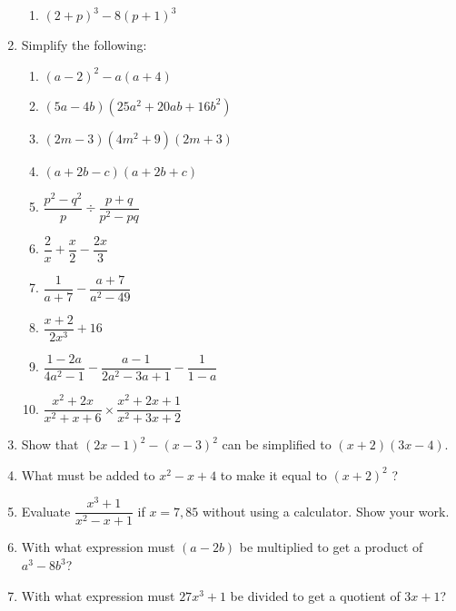 \begin{eocexercises}{}
\begin{enumerate}[itemsep=5pt, label=\textbf{\arabic*}. ]
\begin{multicols}{2}
\begin{enumerate}[itemsep=2pt, label=\textbf{(\alph*)} ]
\item $(2+p)^3- 8(p+1)^3$
\end{enumerate}
\end{multicols}
\item Simplify the following:
\begin{multicols}{2}
\begin{enumerate}[itemsep=4pt, label=\textbf{(\alph*)} ] 
\item ${(a-2)}^{2}-a(a+4)$
\item $(5a-4b)(25{a}^{2}+20ab+16{b}^{2})$
\item $(2m-3)(4{m}^{2}+9)(2m+3)$
\item $(a+2b-c)(a+2b+c)$
\item $\dfrac{{p}^{2}-{q}^{2}}{p}÷\dfrac{p+q}{{p}^{2}-pq}$
\item $\dfrac{2}{x}+\dfrac{x}{2}-\dfrac{2x}{3}$
\item $\dfrac{1}{a+7}-\dfrac{a+7}{a^{2}-49}$
\item $\dfrac{x+2}{2x^{3}} + 16$
\item $\dfrac{1-2a}{4a^{2} -1} - \dfrac{a-1}{2a^{2}-3a+1} - \dfrac{1}{1-a}$
\item $\dfrac{x^{2} + 2x}{x^{2}+ x + 6} \times \dfrac{x^{2} + 2x + 1}{x^{2} + 3x +2}$
\end{enumerate}
\end{multicols}
\item Show that ${(2x-1)}^{2}-{(x-3)}^{2}$ can be simplified to $(x+2)(3x-4)$.
\item What must be added to ${x}^{2}-x+4$ to make it equal to ${(x+2)}^{2}$ ?
\item Evaluate $\dfrac{x^{3}+1}{x^{2}-x+1}$ if $x=7,85$ without using a calculator. Show your work.
\item With what expression must $(a-2b)$ be multiplied to get a product of $a^3-8b^3$?
\item With what expression must $27x^3+1$ be divided to get a quotient of $3x+1$?
\end{enumerate}

\end{eocexercises}

